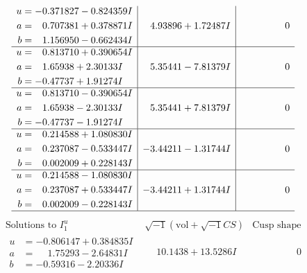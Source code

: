 \documentclass[1p]{elsarticle_modified}
\theoremstyle{definition}
\newcommand{\I}{\sqrt{-1}}
\begin{document}
$$\begin{array}{c|c|c}
\begin{aligned}
u &= -0.371827 - 0.824359 I \\
a &= \phantom{-}0.707381 + 0.378871 I \\
b &= \phantom{-}1.156950 - 0.662434 I\end{aligned}
 & \phantom{-}4.93896 + 1.72487 I & \phantom{-0.000000 } 0 \\ \hline\begin{aligned}
u &= \phantom{-}0.813710 + 0.390654 I \\
a &= \phantom{-}1.65938 + 2.30133 I \\
b &= -0.47737 + 1.91274 I\end{aligned}
 & \phantom{-}5.35441 - 7.81379 I & \phantom{-0.000000 } 0 \\ \hline\begin{aligned}
u &= \phantom{-}0.813710 - 0.390654 I \\
a &= \phantom{-}1.65938 - 2.30133 I \\
b &= -0.47737 - 1.91274 I\end{aligned}
 & \phantom{-}5.35441 + 7.81379 I & \phantom{-0.000000 } 0 \\ \hline\begin{aligned}
u &= \phantom{-}0.214588 + 1.080830 I \\
a &= \phantom{-}0.237087 - 0.533447 I \\
b &= \phantom{-}0.002009 + 0.228143 I\end{aligned}
 & -3.44211 - 1.31744 I & \phantom{-0.000000 } 0 \\ \hline\begin{aligned}
u &= \phantom{-}0.214588 - 1.080830 I \\
a &= \phantom{-}0.237087 + 0.533447 I \\
b &= \phantom{-}0.002009 - 0.228143 I\end{aligned}
 & -3.44211 + 1.31744 I & \phantom{-0.000000 } 0\\
 \hline 
 \end{array}$$\newpage$$\begin{array}{c|c|c}  
\text{Solutions to }I^u_{1}& \I (\text{vol} + \sqrt{-1}CS) & \text{Cusp shape}\\
 \hline 
\begin{aligned}
u &= -0.806147 + 0.384835 I \\
a &= \phantom{-}1.75293 - 2.64831 I \\
b &= -0.59316 - 2.20336 I\end{aligned}
 & \phantom{-}10.1438 + 13.5286 I & \phantom{-0.000000 } 0 \\ \hline\begin{aligned}

\end{aligned}
\end{array}$$
\end{document}
